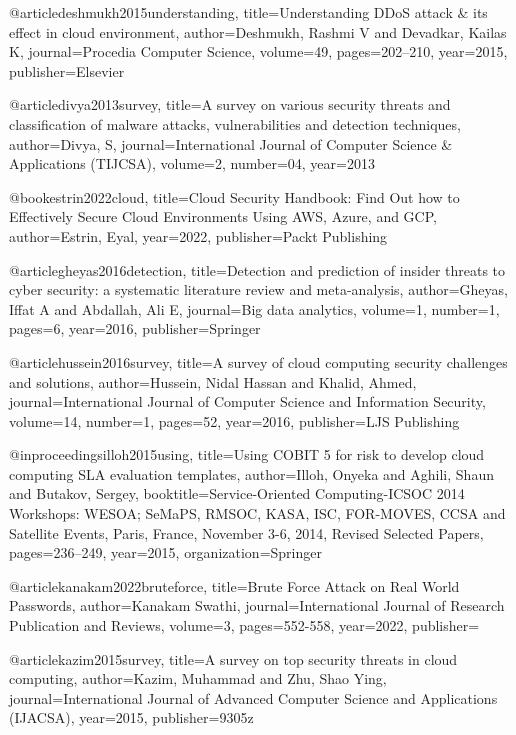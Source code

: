 @article{deshmukh2015understanding,
title={Understanding DDoS attack \& its effect in cloud environment},
author={Deshmukh, Rashmi V and Devadkar, Kailas K},
journal={Procedia Computer Science},
volume={49},
pages={202--210},
year={2015},
publisher={Elsevier}
}

@article{divya2013survey,
title={A survey on various security threats and classification of malware attacks, vulnerabilities and detection techniques},
author={Divya, S},
journal={International Journal of Computer Science \& Applications (TIJCSA)},
volume={2},
number={04},
year={2013}
}

@book{estrin2022cloud,
title={Cloud Security Handbook: Find Out how to Effectively Secure Cloud Environments Using AWS, Azure, and GCP},
author={Estrin, Eyal},
year={2022},
publisher={Packt Publishing}
}

@article{gheyas2016detection,
title={Detection and prediction of insider threats to cyber security: a systematic literature review and meta-analysis},
author={Gheyas, Iffat A and Abdallah, Ali E},
journal={Big data analytics},
volume={1},
number={1},
pages={6},
year={2016},
publisher={Springer}
}

@article{hussein2016survey,
title={A survey of cloud computing security challenges and solutions},
author={Hussein, Nidal Hassan and Khalid, Ahmed},
journal={International Journal of Computer Science and Information Security},
volume={14},
number={1},
pages={52},
year={2016},
publisher={LJS Publishing}
}

@inproceedings{illoh2015using,
title={Using COBIT 5 for risk to develop cloud computing SLA evaluation templates},
author={Illoh, Onyeka and Aghili, Shaun and Butakov, Sergey},
booktitle={Service-Oriented Computing-ICSOC 2014 Workshops: WESOA; SeMaPS, RMSOC, KASA, ISC, FOR-MOVES, CCSA and Satellite Events, Paris, France, November 3-6, 2014, Revised Selected Papers},
pages={236--249},
year={2015},
organization={Springer}
}

@article{kanakam2022bruteforce,
title={Brute Force Attack on Real World Passwords},
author={Kanakam Swathi},
journal={International Journal of Research Publication and Reviews},
volume={3},
pages={552-558},
year={2022},
publisher={}
}

@article{kazim2015survey,
title={A survey on top security threats in cloud computing},
author={Kazim, Muhammad and Zhu, Shao Ying},
journal={International Journal of Advanced Computer Science and Applications (IJACSA)},
year={2015},
publisher={9305z}
}

